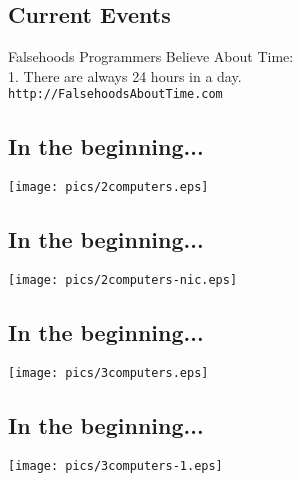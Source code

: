 \documentclass[xga]{xdvislides}
\begin{document}
\subsection{Current Events}
\Huge
\begin{center}
Falsehoods Programmers Believe About Time: \\

\vspace{.5in}
1. There are always 24 hours in a day. \\

\vspace{.5in}
\verb+http://FalsehoodsAboutTime.com+
\end{center}
\Normalsize

\subsection{In the beginning...}
\vspace*{\fill}
\begin{center}
	\texttt{[image: pics/2computers.eps]} \\
\end{center}
\vspace*{\fill}

\subsection{In the beginning...}
\vspace*{\fill}
\begin{center}
	\texttt{[image: pics/2computers-nic.eps]} \\
\end{center}
\vspace*{\fill}

\subsection{In the beginning...}
\vspace*{\fill}
\begin{center}
	\texttt{[image: pics/3computers.eps]} \\
\end{center}
\vspace*{\fill}

\subsection{In the beginning...}
\vspace*{\fill}
\begin{center}
	\texttt{[image: pics/3computers-1.eps]} \\
\end{center}
\vspace*{\fill}
\end{document}
